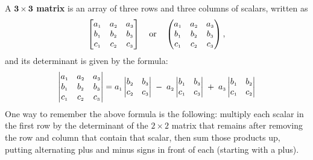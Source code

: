 A \textbf{$\bm{3 \times 3}$ matrix} is an array of three rows and three columns of scalars, written as
\begin{displaymath}
 \begin{bmatrix}
  a_{\scriptscriptstyle 1} & a_{\scriptscriptstyle 2} &a_{\scriptscriptstyle 3}\\
  b_{\scriptscriptstyle 1} & b_{\scriptscriptstyle 2} &b_{\scriptscriptstyle 3}\\
  c_{\scriptscriptstyle 1} & c_{\scriptscriptstyle 2} &c_{\scriptscriptstyle 3}
 \end{bmatrix}
 \quad\text{or}\quad
 \begin{pmatrix}
  a_{\scriptscriptstyle 1} & a_{\scriptscriptstyle 2} &a_{\scriptscriptstyle 3}\\
  b_{\scriptscriptstyle 1} & b_{\scriptscriptstyle 2} &b_{\scriptscriptstyle 3}\\
  c_{\scriptscriptstyle 1} & c_{\scriptscriptstyle 2} &c_{\scriptscriptstyle 3}
 \end{pmatrix},
\end{displaymath}
and its determinant is given by the formula:
\begin{equation}
 \begin{vmatrix}
  a_{\scriptscriptstyle 1} & a_{\scriptscriptstyle 2} &a_{\scriptscriptstyle 3}\\
  b_{\scriptscriptstyle 1} & b_{\scriptscriptstyle 2} &b_{\scriptscriptstyle 3}\\
  c_{\scriptscriptstyle 1} & c_{\scriptscriptstyle 2} &c_{\scriptscriptstyle 3}
 \end{vmatrix}
 = a_{\scriptscriptstyle 1} \begin{vmatrix} b_{\scriptscriptstyle 2} & b_{\scriptscriptstyle 3} \\ c_{\scriptscriptstyle 2} & c_{\scriptscriptstyle 3} \end{vmatrix} \;-\;
 a_{\scriptscriptstyle 2} \begin{vmatrix} b_{\scriptscriptstyle 1} & b_{\scriptscriptstyle 3} \\ c_{\scriptscriptstyle 1} & c_{\scriptscriptstyle 3} \end{vmatrix} \;+\;
 a_{\scriptscriptstyle 3} \begin{vmatrix} b_{\scriptscriptstyle 1} & b_{\scriptscriptstyle 2} \\ c_{\scriptscriptstyle 1} & c_{\scriptscriptstyle 2} \end{vmatrix}\label{eqn:det3}
\end{equation}
One way to remember the above formula is the following: multiply each scalar in the first row by the determinant
of the $2 \times 2$ matrix that remains after removing the row and column that contain that scalar, then sum those
products up, putting alternating plus and minus signs in front of each (starting with a plus).

